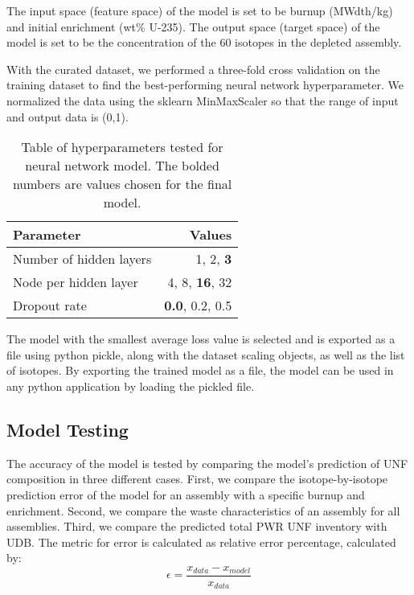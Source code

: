 The input space (feature space) of the model is set to
be burnup (MWdth/kg) and initial enrichment (wt\% U-235).
The output space (target space) of the model is set to
be the concentration of the 60 isotopes in the
depleted assembly.

With the curated dataset, we performed a three-fold
cross validation on the training dataset to find the
best-performing neural network hyperparameter. We
normalized the data using the sklearn MinMaxScaler
so that the range of input and output data is (0,1).

\begin{table}[h]
    \centering
    \begin{tabular}{lr}
        \hline
        Parameter & Values \\
        \hline
        Number of hidden layers & 1, 2, \textbf{3} \\
        Node per hidden layer & 4, 8, \textbf{16}, 32 \\
        Dropout rate & \textbf{0.0}, 0.2, 0.5 \\
        \hline
    \end{tabular}
    \caption{Table of hyperparameters tested
             for neural network model. The bolded
             numbers are values chosen for the final model.}
\end{table}

The model with the smallest average loss value
is selected and is exported as a file using python
pickle, along with the dataset scaling objects, as well as
the list of isotopes. By exporting the trained model
as a file, the model can be used in any python
application by loading the pickled file.


\subsection{Model Testing}

The accuracy of the model is tested by comparing
the model's prediction of \gls{UNF} composition
in three different cases. First, we compare the
isotope-by-isotope prediction error of the model for an
assembly with a specific burnup and enrichment.
Second, we compare the waste characteristics of
an assembly for all assemblies. Third, we compare
the predicted total \gls{PWR} \gls{UNF} inventory with
\gls{UDB}. The metric for error is calculated as
relative error percentage, calculated by:
\begin{equation}
\epsilon = \frac{x_{data} - x_{model}}{x_{data}}
\end{equation}

